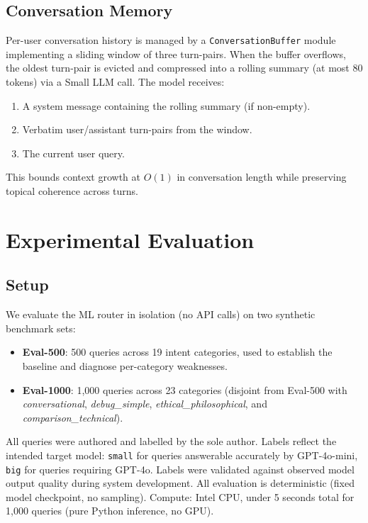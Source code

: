 \documentclass{article}
\newcommand{\smallmdl}{GPT-4o-mini}
\newcommand{\largemdl}{GPT-4o}
\begin{document}
\subsection{Conversation Memory}
\label{sec:memory}

Per-user conversation history is managed by a \texttt{ConversationBuffer}
module implementing a sliding window of three turn-pairs. When the buffer
overflows, the oldest turn-pair is evicted and compressed into a rolling
summary (at most 80 tokens) via a Small LLM call. The model receives:
\begin{enumerate}
    \item A system message containing the rolling summary (if non-empty).
    \item Verbatim user/assistant turn-pairs from the window.
    \item The current user query.
\end{enumerate}
This bounds context growth at $O(1)$ in conversation length while
preserving topical coherence across turns.

\section{Experimental Evaluation}
\label{sec:experiments}

\subsection{Setup}
\label{sec:setup}

We evaluate the ML router in isolation (no API calls) on two synthetic
benchmark sets:
\begin{itemize}
    \item \textbf{Eval-500}: 500 queries across 19 intent categories,
          used to establish the baseline and diagnose per-category weaknesses.
    \item \textbf{Eval-1000}: 1,000 queries across 23 categories (disjoint from
          Eval-500 with \emph{conversational}, \emph{debug\_simple},
          \emph{ethical\_philosophical}, and \emph{comparison\_technical}).
\end{itemize}
All queries were authored and labelled by the sole author. Labels reflect
the intended target model: \texttt{small} for queries answerable accurately
by \smallmdl{}, \texttt{big} for queries requiring \largemdl{}. Labels were
validated against observed model output quality during system development.
All evaluation is deterministic (fixed model checkpoint, no sampling).
Compute: Intel CPU, under 5 seconds total for 1,000 queries (pure Python
inference, no GPU).
\end{document}
